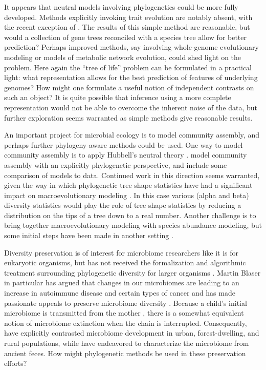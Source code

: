 \documentclass{amsart}
\begin{document}
It appears that neutral models involving phylogenetics could be more fully developed.
Methods explicitly invoking trait evolution are notably absent, with the recent exception of \citep{langille2013predictive}.
The results of this simple method are reasonable, but would a collection of gene trees reconciled with a species tree allow for better prediction?
Perhaps improved methods, say involving whole-genome evolutionary modeling or models of metabolic network evolution, could shed light on the problem.
Here again the ``tree of life'' problem can be formulated in a practical light: what representation allows for the best prediction of features of underlying genomes?
How might one formulate a useful notion of independent contrasts \citep{felsenstein1985phylogenies} on such an object?
It is quite possible that inference using a more complete representation would not be able to overcome the inherent noise of the data, but further exploration seems warranted as simple methods give reasonable results.

An important project for microbial ecology is to model community assembly, and perhaps further phylogeny-aware methods could be used.
One way to model community assembly is to apply Hubbell's neutral theory \citep{fierer2012animalcules,costello2012application}.
\citet{o2012phylogenetic} model community assembly with an explicitly phylogenetic perspective, and include some comparison of models to data.
Continued work in this direction seems warranted, given the way in which phylogenetic tree shape statistics have had a significant impact on macroevolutionary modeling \citep{mooers1997inferring,aldous2011five}.
In this case various (alpha and beta) diversity statistics would play the role of tree shape statistics by reducing a distribution on the tips of a tree down to a real number.
Another challenge is to bring together macroevolutionary modeling with species abundance modeling, but some initial steps have been made in another setting \citep{lambert2013predicting}.

Diversity preservation is of interest for microbiome researchers like it is for eukaryotic organisms, but has not received the formalization and algorithmic treatment surrounding phylogenetic diversity for larger organisms \citep{hartmann2006maximizing,pardi2007resource}.
Martin Blaser in particular has argued that changes in our microbiomes are leading to an increase in autoimmune disease and certain types of cancer \citep[reviewed in][]{cho2012human} and has made passionate appeals to preserve microbiome diversity \citep{blaser2011antibiotic}.
Because a child's initial microbiome is transmitted from the mother \citep[reviewed in][]{funkhouser2013mom}, there is a somewhat equivalent notion of microbiome extinction when the chain is interrupted.
Consequently, \citet{yatsunenko2012human} have explicitly contrasted microbiome development in urban, forest-dwelling, and rural populations, while \citet{tito2012insights} have endeavored to characterize the microbiome from ancient feces.
How might phylogenetic methods be used in these preservation efforts?
\end{document}
